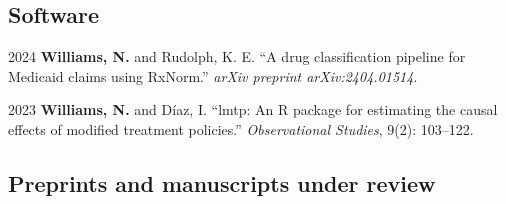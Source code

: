 \documentclass[12pt,letterpaper]{report}
\begin{document}
    \subsection*{Software}
    
    \begin{tablist}
    
    \item[2024] \tab \textbf{Williams, N.} and Rudolph, K. E. \enquote{A drug classification pipeline for Medicaid claims using RxNorm.} \textit{arXiv preprint arXiv:2404.01514}.
    
    \item[2023] \tab \textbf{Williams, N.} and Díaz, I. \enquote{lmtp: An R package for estimating the causal effects of modified treatment policies.} \textit{Observational Studies}, 9(2): 103--122.
    
    \end{tablist}
    
    \subsection*{Preprints and manuscripts under review}
    
\end{document}
